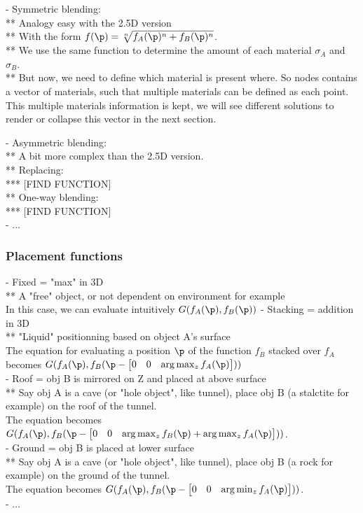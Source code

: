 - Symmetric blending: \\
** Analogy easy with the 2.5D version \\
** With the form $f(\p) = \sqrt[n]{f_A(\p)^n + f_B(\p)^n}$. \\
** We use the same function to determine the amount of each material $\sigma_A$ and $\sigma_B$. \\
** But now, we need to define which material is present where. So nodes contains a vector of materials, such that multiple materials can be defined as each point. This multiple materials information is kept, we will see different solutions to render or collapse this vector in the next section.

- Asymmetric blending: \\
** A bit more complex than the 2.5D version. \\
** Replacing: \\
*** [FIND FUNCTION] \\
** One-way blending: \\
*** [FIND FUNCTION] \\
- ...

\subsubsection{Placement functions}
- Fixed = "max" in 3D \\
** A "free" object, or not dependent on environment for example \\
In this case, we can evaluate intuitively $G(f_A(\p), f_B(\p))$
- Stacking = addition in 3D \\
** "Liquid" positionning based on object A's surface \\
The equation for evaluating a position $\p$ of the function $f_B$ stacked over $f_A$ becomes $G(f_A(\p), f_B(\p - \begin{bmatrix}0 & 0 & \arg \max_z f_A(\p)\end{bmatrix}))$ \\
- Roof = obj B is mirrored on Z and placed at above surface \\
** Say obj A is a cave (or "hole object", like tunnel), place obj B (a stalctite for example) on the roof of the tunnel. \\
The equation becomes $G(f_A(\p), f_B(\p - \begin{bmatrix}0 & 0 & \arg \max_z f_B(\p) + \arg \max_z f_A(\p)\end{bmatrix}))$. \\
- Ground = obj B is placed at lower surface \\
** Say obj A is a cave (or "hole object", like tunnel), place obj B (a rock for example) on the ground of the tunnel. \\
The equation becomes $G(f_A(\p), f_B(\p - \begin{bmatrix}0 & 0 & \arg \min_z f_A(\p)\end{bmatrix}))$. \\
- ...

